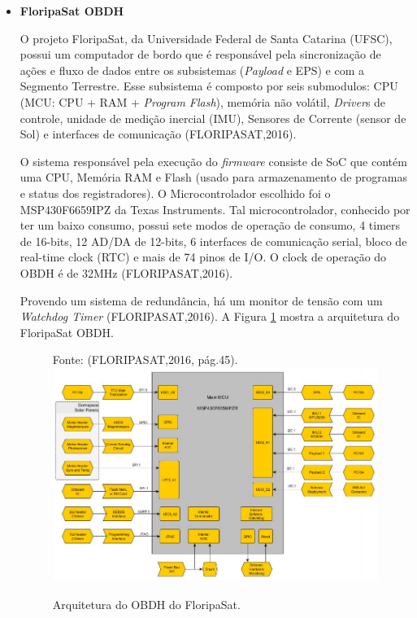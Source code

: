 \begin{itemize}

\item \textbf{FloripaSat OBDH}

	O projeto FloripaSat, da Universidade Federal de Santa Catarina (UFSC), possui um  computador de bordo que é responsável pela sincronização de ações e fluxo de dados entre os subsistemas (\textit{Payload} e EPS) e com a Segmento Terrestre. Esse subsistema é composto por seis submodulos: CPU (MCU: CPU + RAM + \textit{Program Flash}), memória não volátil, \textit{Driver}s de controle, unidade de medição inercial (IMU), Sensores de Corrente (sensor de Sol) e interfaces de comunicação (FLORIPASAT,2016).

	O sistema responsável pela execução do \textit{firmware} consiste de SoC que contém uma CPU, Memória RAM e Flash (usado para armazenamento de programas e status dos registradores). O Microcontrolador escolhido foi o MSP430F6659IPZ da Texas Instruments. Tal microcontrolador, conhecido por ter um baixo consumo, possui sete modos de operação de consumo, 4 timers de 16-bits, 12 AD/DA de 12-bits, 6 interfaces de comunicação serial, bloco de real-time clock (RTC) e mais de 74 pinos de I/O. O clock de operação do OBDH é de 32MHz (FLORIPASAT,2016).

	Provendo um sistema de redundância, há um monitor de tensão com um \textit{Watchdog Timer} (FLORIPASAT,2016). A Figura \ref{fig12} mostra a arquitetura do FloripaSat OBDH.

\begin{figure}[h]
	\centering
	Fonte: (FLORIPASAT,2016, pág.45).\linebreak
	\includegraphics[keepaspectratio=true,scale=0.5]{figuras/floripasatobdh.PNG}
	\caption{Arquitetura do OBDH do FloripaSat.}
	\label{fig12}
\end{figure}


\end{itemize}

